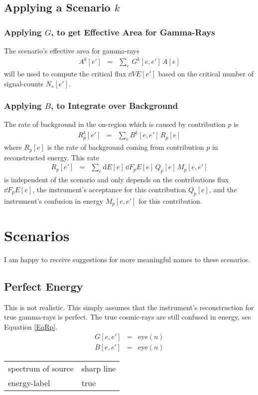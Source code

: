 \documentclass{article}%
\begin{document}
\subsection{Applying a Scenario $k$}
%
\subsubsection*{Applying $G$, to get Effective Area for Gamma-Rays}
%
The scenario's effective area for gamma-rays
%
\begin{eqnarray}
A^k[e'] &=& \sum_{e} \, G^k[e, e'] \, A[e]
\end{eqnarray}
%
will be used to compute the critical flux $\dd{V}{E}[e']$ based on the critical number of signal-counts $N_s[e']$.
%
\subsubsection*{Applying $B$, to Integrate over Background}
%
The rate of background in the on-region which is caused by contribution $p$ is
%
\begin{eqnarray}
R^k_p[e'] &=& \sum_{e} B^k[e, e'] \, R_p[e]
\end{eqnarray}
%
where $R_p[e]$ is the rate of background coming from contribution $p$ in reconstructed energy.
%
This rate
%
\begin{eqnarray}
R_p[e'] &=& \sum_{e} \text{d}E[e] \, \dd{F_p}{E}[e] \, Q_p[e] \, M_p[e, e']
\label{EqRp}
\end{eqnarray}
%
 is independent of the scenario and only depends on the contributions flux $\dd{F_p}{E}[e]$, the instrument's acceptance for this contribution $Q_p[e]$, and the instrument's confusion in energy $M_p[e, e']$ for this contribution.
%
\section{Scenarios}
%
I am happy to receive suggestions for more meaningful names to these scenarios.
%
\subsection{Perfect Energy}
%
This is not realistic. This simply assumes that the instrument's reconstruction for true gamma-rays is perfect.
%
The true cosmic-rays are still confused in energy, see Equation \ref{EqRp}.
%
\begin{eqnarray}
G[e, e'] &=& \mathrm{eye}(n)
\\
B[e, e'] &=& \mathrm{eye}(n)
\end{eqnarray}
%
\begin{center}
\begin{tabular}{ll}
spectrum of source & sharp line\\
energy-label & true\\
\end{tabular}
\end{center}
%
\end{document}
